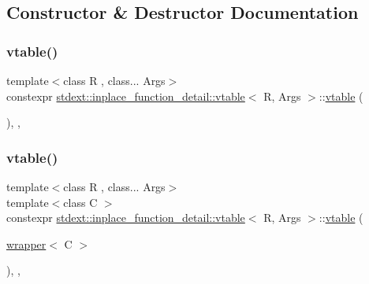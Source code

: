 \subsection{Constructor \& Destructor Documentation}
\mbox{\label{structstdext_1_1inplace__function__detail_1_1vtable_acec966ae149e457bf0f5042974254ba4}} 
\subsubsection{\texorpdfstring{vtable()}{vtable()}\hspace{0.1cm}{\footnotesize\ttfamily [1/8]}}
{\footnotesize\ttfamily template$<$class R , class... Args$>$ \\
constexpr \hyperlink{structstdext_1_1inplace__function__detail_1_1vtable}{stdext\+::inplace\+\_\+function\+\_\+detail\+::vtable}$<$ R, Args $>$\+::\hyperlink{structstdext_1_1inplace__function__detail_1_1vtable}{vtable} (\begin{DoxyParamCaption}{ }\end{DoxyParamCaption})\hspace{0.3cm}{\ttfamily [inline]}, {\ttfamily [explicit]}, {\ttfamily [noexcept]}}

\mbox{\label{structstdext_1_1inplace__function__detail_1_1vtable_ae59e9dfc5b677cbb7f9397cfc52f2b47}} 
\subsubsection{\texorpdfstring{vtable()}{vtable()}\hspace{0.1cm}{\footnotesize\ttfamily [2/8]}}
{\footnotesize\ttfamily template$<$class R , class... Args$>$ \\
template$<$class C $>$ \\
constexpr \hyperlink{structstdext_1_1inplace__function__detail_1_1vtable}{stdext\+::inplace\+\_\+function\+\_\+detail\+::vtable}$<$ R, Args $>$\+::\hyperlink{structstdext_1_1inplace__function__detail_1_1vtable}{vtable} (\begin{DoxyParamCaption}\item[{\hyperlink{structstdext_1_1inplace__function__detail_1_1wrapper}{wrapper}$<$ C $>$}]{ }\end{DoxyParamCaption})\hspace{0.3cm}{\ttfamily [inline]}, {\ttfamily [explicit]}, {\ttfamily [noexcept]}}

